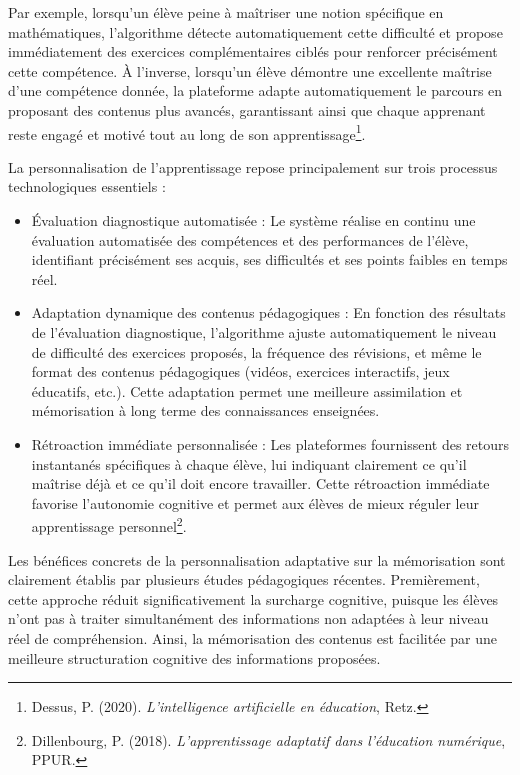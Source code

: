 \documentclass[11pt,a4paper]{report}
\begin{document}
Par exemple, lorsqu’un élève peine à maîtriser une notion spécifique en mathématiques, l’algorithme détecte automatiquement cette difficulté et propose immédiatement des exercices complémentaires ciblés pour renforcer précisément cette compétence. À l’inverse, lorsqu’un élève démontre une excellente maîtrise d’une compétence donnée, la plateforme adapte automatiquement le parcours en proposant des contenus plus avancés, garantissant ainsi que chaque apprenant reste engagé et motivé tout au long de son apprentissage\footnote{Dessus, P. (2020). \textit{L’intelligence artificielle en éducation}, Retz.}.

La personnalisation de l’apprentissage repose principalement sur trois processus technologiques essentiels :

\begin{itemize}
    \item Évaluation diagnostique automatisée :
Le système réalise en continu une évaluation automatisée des compétences et des performances de l’élève, identifiant précisément ses acquis, ses difficultés et ses points faibles en temps réel.

    \item Adaptation dynamique des contenus pédagogiques :
En fonction des résultats de l’évaluation diagnostique, l’algorithme ajuste automatiquement le niveau de difficulté des exercices proposés, la fréquence des révisions, et même le format des contenus pédagogiques (vidéos, exercices interactifs, jeux éducatifs, etc.). Cette adaptation permet une meilleure assimilation et mémorisation à long terme des connaissances enseignées.

    \item Rétroaction immédiate personnalisée :
Les plateformes fournissent des retours instantanés spécifiques à chaque élève, lui indiquant clairement ce qu’il maîtrise déjà et ce qu’il doit encore travailler. Cette rétroaction immédiate favorise l’autonomie cognitive et permet aux élèves de mieux réguler leur apprentissage personnel\footnote{Dillenbourg, P. (2018). \textit{L’apprentissage adaptatif dans l’éducation numérique}, PPUR.}.

\end{itemize}

Les bénéfices concrets de la personnalisation adaptative sur la mémorisation sont clairement établis par plusieurs études pédagogiques récentes. Premièrement, cette approche réduit significativement la surcharge cognitive, puisque les élèves n’ont pas à traiter simultanément des informations non adaptées à leur niveau réel de compréhension. Ainsi, la mémorisation des contenus est facilitée par une meilleure structuration cognitive des informations proposées.
\end{document}
